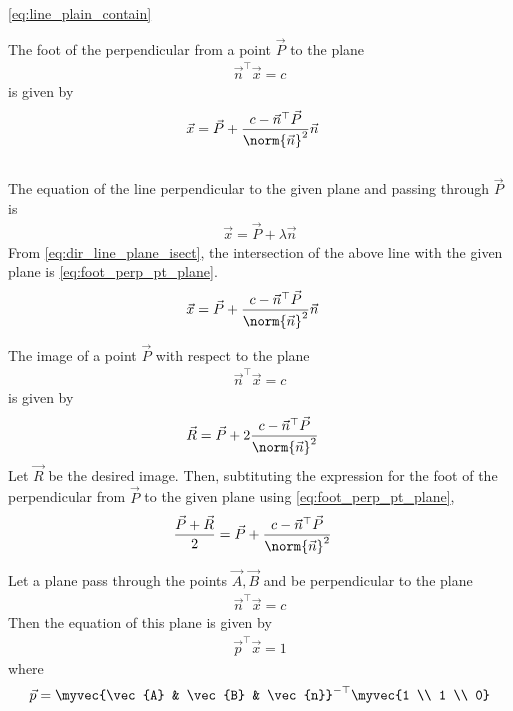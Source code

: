 			\eqref{eq:line_plain_contain}
		\item The foot of the perpendicular from a point $\vec{P}$ to the plane 
		\begin{align}
			\vec{n}^{\top}\vec{x} =c
		\end{align}
		is given by 
\begin{align}
	\vec{x} &= \vec{P} + \frac{c - \vec{n}^{\top}\vec{P}}{\norm{\vec{n}}^2}
\vec{n}
	\label{eq:foot_perp_pt_plane}
\end{align}
		\\
		\solution The equation of the line perpendicular to the given plane and passing through $\vec{P}$ is 
		\begin{align}
			\vec{x} = \vec{P} + \lambda 	\vec{n}
		\end{align}
		From 
	\eqref{eq:dir_line_plane_isect}, the intersection of the above line with the given plane is 
	\eqref{eq:foot_perp_pt_plane}.
\begin{align}
	\vec{x} &= \vec{P} + \frac{c - \vec{n}^{\top}\vec{P}}{\norm{\vec{n}}^2}
\vec{n}
	\label{eq:foot_perp_pt_plane}
\end{align}
\item The image of a point $\vec{P}$ with respect to the plane 
		\begin{align}
			\vec{n}^{\top}\vec{x} =c
		\end{align}
		is given by 
		\begin{align}
			\vec{R} &=
	  \vec{P} + 2\frac{c - \vec{n}^{\top}\vec{P}}{\norm{\vec{n}}^2}
			\label{eq:image_pt_plane}
		\end{align}
		\solution Let $\vec{R}$ be the desired image.  Then, subtituting the expression for the  foot of the perpendicular from $\vec{P}$ to the given plane using 
	\eqref{eq:foot_perp_pt_plane},
		\begin{align}
			\frac{\vec{P}+\vec{R}}{2} &=
	  \vec{P} + \frac{c - \vec{n}^{\top}\vec{P}}{\norm{\vec{n}}^2}
		\end{align}
		\item Let a plane pass through the points $\vec{A},\vec{B}$ and be perpendicular to the plane 
		\begin{align}
		\vec{n}^{\top}\vec{x} =c 
			\label{eq:plane_3d_2pt_perp_given}
		\end{align}
		Then the equation of this plane is given by 
		\begin{align}
		\vec{p}^{\top}\vec{x} = 1
			\label{eq:plane_3d_2pt}
		\end{align}
		where
		\begin{align}
			\vec{p} = 		\myvec{\vec{A} & \vec{B} & \vec{n}}^{-\top}  \myvec{1 \\ 1 \\ 0}
			\label{eq:plane_3d_2pt_perp_norm}
		\end{align}
